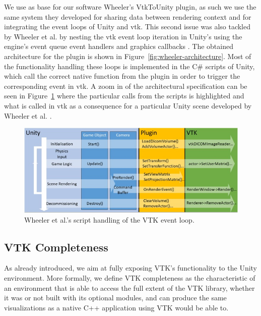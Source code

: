 We use as base for our software Wheeler's VtkToUnity plugin, as such we use the same system they developed for sharing data between rendering context and for integrating the event loops of Unity and \acrshort{vtk}. This second issue was also tackled by Wheeler et al. by nesting the \acrshort{vtk} event loop iteration in Unity's using the engine's event queue event handlers and graphics callbacks \cite{wheeler_virtual_2018}. The obtained architecture for the plugin is shown in Figure~\ref{fig:wheeler-architecture}. Most of the functionality handling these loops is implemented in the C\# scripts of Unity, which call the correct native function from the plugin in order to trigger the corresponding event in \acrshort{vtk}. A zoom in of the architectural specification can be seen in Figure~\ref{fig:wheeler-architecture-zoomin} where the particular calls from the scripts is highlighted and what is called in \acrshort{vtk} as a consequence for a particular Unity scene developed by Wheeler et al. \cite{wheeler_virtual_2018}.

\begin{figure}[t]
    \centering
    \includegraphics[width=\textwidth]{pictures/wheeler_architecture_zoomin.jpg}
    \caption{Wheeler et al.'s script handling of the VTK event loop.}
    \label{fig:wheeler-architecture-zoomin}
\end{figure}

\subsection{VTK Completeness}

As already introduced, we aim at fully exposing VTK's functionality to the Unity environment. More formally, we define VTK completeness as the characteristic of an environment that is able to access the full extent of the VTK library, whether it was or not built with its optional modules, and can produce the same visualizations as a native C++ application using VTK would be able to. 

